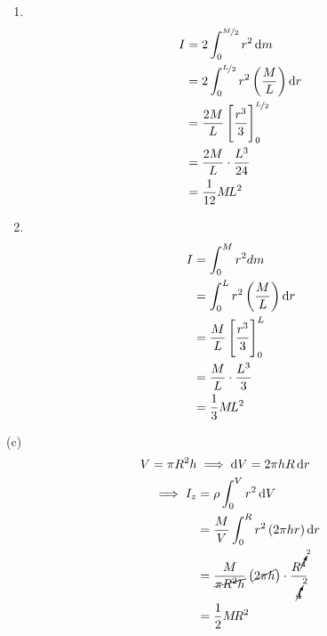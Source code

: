 \documentclass[answers]{exam}
\begin{document}
\begin{questions}
{		\begin{solution}
			\begin{multicols}{2}
				\begin{enumerate}[label=(\alph*)]
					\item \textcolor{white}{.}
					\vspace{-2.8em}
						\begin{align*}
							I &= 2\int^{\nicefrac{M}{2}}_0 r^2 \dif{m} \\
							&= 2\int^{\nicefrac{L}{2}}_0 r^2 \left(\frac{M}{L}\right) \dif{r} \\
							&= \frac{2M}{L} \left[\frac{r^3}{3}\right]^{\nicefrac{L}{2}}_0 \\
							&= \frac{2M}{L} \cdot \frac{L^3}{24} \\
							&= \frac{1}{12}M\!L^2
						\end{align*}
					\item \textcolor{white}{.}
					\vspace{-3.2em}
						\begin{align*}
							I &= \int^M_0 r^2 dm \\
							&= \int^L_0 r^2 \left(\frac{M}{L}\right) \dif{r} \\
							&= \frac{M}{L} \left[\frac{r^3}{3}\right]^L_0 \\
							&= \frac{M}{L} \cdot \frac{L^3}{3} \\
							&= \frac{1}{3}M\!L^2
						\end{align*}
				\end{enumerate}
			\end{multicols}
			(c)
			\vspace{-2em}
			\begin{align*}
				V = \pi R^2 h &\implies \dif{V} = 2\pi hR \dif{r} \\
				\implies I_z &= \rho \int^V_0 r^2 \dif{V} \\
				&= \frac{M}{V} \int^R_0 r^2 \left(2\pi h r\right) \dif{r} \\
				&= \frac{M}{\cancel{\pi R^2h}} \left(\cancel{2\pi h}\right) \cdot \frac{R^{\cancelto{2}{4}}}{\cancelto{2}{4}} \\
				&= \frac{1}{2}M\!R^2
			\end{align*}
		\end{solution}
	}
	\ifprintanswers
		\pagebreak
	\fi
\end{questions}
\end{document}

